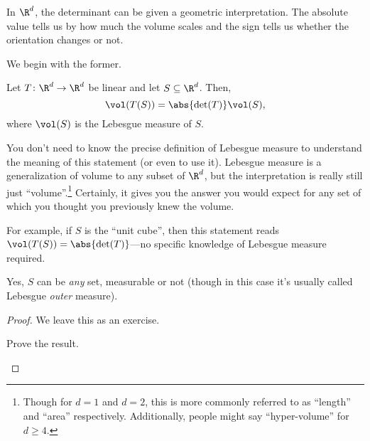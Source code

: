 In $\R ^d$, the determinant can be given a geometric interpretation.  The absolute value tells us by how much the volume scales and the sign tells us whether the orientation changes or not.

We begin with the former.
\begin{thm}{}{}
	Let $T\colon \R ^d\rightarrow \R ^d$ be linear and let $S\subseteq \R ^d$.  Then,
	\begin{equation}
		\vol (T(S))=\abs{\det (T)}\vol (S),
	\end{equation}
	where $\vol (S)$ is the Lebesgue measure of $S$.
	\begin{rmk}
		You don't need to know the precise definition of Lebesgue measure to understand the meaning of this statement (or even to use it).  Lebesgue measure is a generalization of volume to any subset of $\R ^d$, but the interpretation is really still just ``volume''.\footnote{Though for $d=1$ and $d=2$, this is more commonly referred to as ``length'' and ``area'' respectively.  Additionally, people might say ``hyper-volume'' for $d\geq 4$.}  Certainly, it gives you the answer you would expect for any set of which you thought you previously knew the volume.
		
		For example, if $S$ is the ``unit cube'', then this statement reads $\vol (T(S))=\abs{\det (T)}$---no specific knowledge of Lebesgue measure required.
	\end{rmk}
	\begin{rmk}
		Yes, $S$ can be \emph{any} set, measurable or not (though in this case it's usually called Lebesgue \emph{outer} measure).
	\end{rmk}
	\begin{proof}
		We leave this as an exercise.
		\begin{exr}[breakable=false]{}{}
			Prove the result.
		\end{exr}
	\end{proof}
\end{thm}

